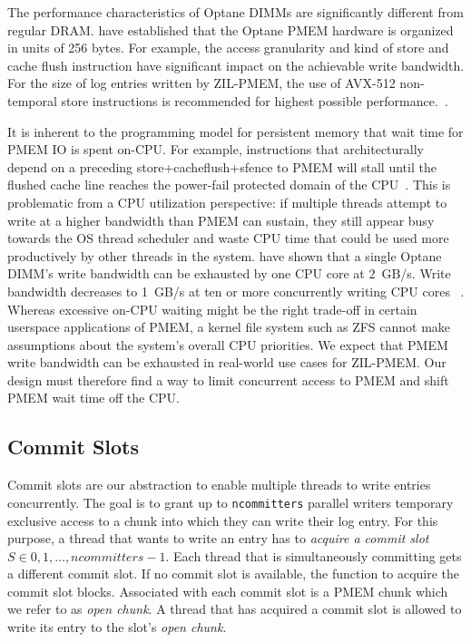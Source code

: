 \documentclass[12pt,a4paper,twoside]{book}
\begin{document}
{\begin{description}[noitemsep]
        The performance characteristics of Optane DIMMs are significantly different from regular DRAM.
        \citeauthor{yangEmpiricalGuideBehavior2020} have established that the Optane PMEM hardware is organized in units of 256 bytes.
        For example, the access granularity and kind of store and cache flush instruction have significant impact on the achievable write bandwidth.
        For the size of log entries written by ZIL-PMEM, the use of  AVX-512 non-temporal store instructions is recommended for highest possible performance.~\cite{yangEmpiricalGuideBehavior2020}.
    \item[PMEM Bandwidth Limits \& Multicore Scalability]
        It is inherent to the programming model for persistent memory that wait time for PMEM IO is spent on-CPU.
        For example, instructions that architecturally depend on a preceding store+cacheflush+sfence to PMEM will stall until the flushed cache line reaches the power-fail protected domain of the CPU~\cite{Scargall2020}.
        This is problematic from a CPU utilization perspective:
        if multiple threads attempt to write at a higher bandwidth than PMEM can sustain, they still appear busy towards the OS thread scheduler and waste CPU time that could be used more productively by other threads in the system.
        \citeauthor{yangEmpiricalGuideBehavior2020} have shown that a single Optane DIMM's write bandwidth can be exhausted by one CPU core at 2~GB/s.
        Write bandwidth decreases to 1~GB/s at ten or more concurrently writing CPU cores ~\cite{yangEmpiricalGuideBehavior2020}.
        Whereas excessive on-CPU waiting might be the right trade-off in certain userspace applications of PMEM, a kernel file system such as ZFS cannot make assumptions about the system's overall CPU priorities.
        We expect that PMEM write bandwidth can be exhausted in real-world use cases for ZIL-PMEM.
        Our design must therefore find a way to limit concurrent access to PMEM and shift PMEM wait time off the CPU.
\end{description}

\subsection{Commit Slots}\label{di:prb:write:chunksel}
Commit slots are our abstraction to enable multiple threads to write entries concurrently.
The goal is to grant up to \lstinline{ncommitters} parallel writers temporary exclusive access to a chunk into which they can write their log entry.
For this purpose, a thread that wants to write an entry has to \textit{acquire a commit slot}~\mbox{$S \in {0, 1, \dots, ncommitters-1}$}.
Each thread that is simultaneously committing gets a different commit slot.
If no commit slot is available, the function to acquire the commit slot blocks.
Associated with each commit slot is a PMEM chunk which we refer to as \textit{open chunk}.
A thread that has acquired a commit slot is allowed to write its entry to the slot's \textit{open chunk}.

}
\end{document}
